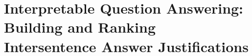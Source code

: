 \chapter{Interpretable Question Answering: Building and Ranking Intersentence Answer Justifications \label{chapter:cl2017}}

%
%









%
%

